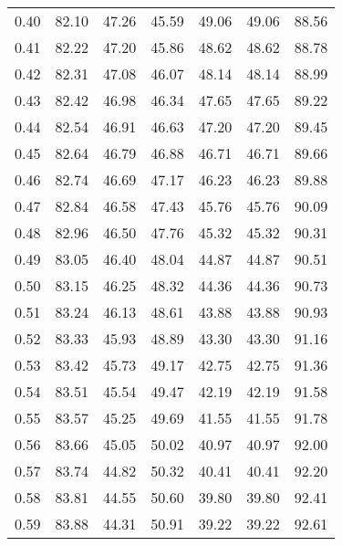 \begin{tabular}{|c|c|c|c|c|c|c|}
      0.40 &     82.10 &     47.26 &      45.59 &   49.06 &      49.06 &         88.56 \\
      0.41 &     82.22 &     47.20 &      45.86 &   48.62 &      48.62 &         88.78 \\
      0.42 &     82.31 &     47.08 &      46.07 &   48.14 &      48.14 &         88.99 \\
      0.43 &     82.42 &     46.98 &      46.34 &   47.65 &      47.65 &         89.22 \\
      0.44 &     82.54 &     46.91 &      46.63 &   47.20 &      47.20 &         89.45 \\
      0.45 &     82.64 &     46.79 &      46.88 &   46.71 &      46.71 &         89.66 \\
      0.46 &     82.74 &     46.69 &      47.17 &   46.23 &      46.23 &         89.88 \\
      0.47 &     82.84 &     46.58 &      47.43 &   45.76 &      45.76 &         90.09 \\
      0.48 &     82.96 &     46.50 &      47.76 &   45.32 &      45.32 &         90.31 \\
      0.49 &     83.05 &     46.40 &      48.04 &   44.87 &      44.87 &         90.51 \\
      0.50 &     83.15 &     46.25 &      48.32 &   44.36 &      44.36 &         90.73 \\
      0.51 &     83.24 &     46.13 &      48.61 &   43.88 &      43.88 &         90.93 \\
      0.52 &     83.33 &     45.93 &      48.89 &   43.30 &      43.30 &         91.16 \\
      0.53 &     83.42 &     45.73 &      49.17 &   42.75 &      42.75 &         91.36 \\
      0.54 &     83.51 &     45.54 &      49.47 &   42.19 &      42.19 &         91.58 \\
      0.55 &     83.57 &     45.25 &      49.69 &   41.55 &      41.55 &         91.78 \\
      0.56 &     83.66 &     45.05 &      50.02 &   40.97 &      40.97 &         92.00 \\
      0.57 &     83.74 &     44.82 &      50.32 &   40.41 &      40.41 &         92.20 \\
      0.58 &     83.81 &     44.55 &      50.60 &   39.80 &      39.80 &         92.41 \\
      0.59 &     83.88 &     44.31 &      50.91 &   39.22 &      39.22 &         92.61 \\

\end{tabular}
